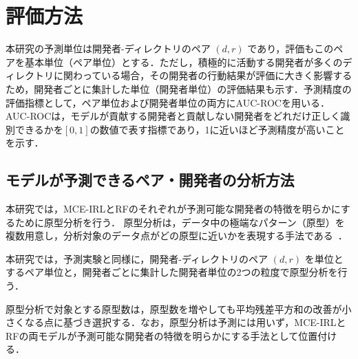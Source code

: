\documentclass[submit,noauthor,ses,dvipdfmx]{ipsj}
\begin{document}
\section{評価方法}\label{sec:evaluation}

本研究の予測単位は開発者-ディレクトリのペア $(d, r)$ であり，評価もこのペアを基本単位（ペア単位）とする．ただし，積極的に活動する開発者が多くのディレクトリに関わっている場合，その開発者の行動結果が評価に大きく影響するため，開発者ごとに集計した単位（開発者単位）の評価結果も示す．予測精度の評価指標として，ペア単位および開発者単位の両方にAUC-ROCを用いる．AUC-ROCは，モデルが貢献する開発者と貢献しない開発者をどれだけ正しく識別できるかを$[0, 1]$の数値で表す指標であり，1に近いほど予測精度が高いことを示す．







\subsection{モデルが予測できるペア・開発者の分析方法}

本研究では，MCE-IRLとRFのそれぞれが予測可能な開発者の特徴を明らかにするために原型分析を行う．
原型分析は，データ中の極端なパターン（原型）を複数用意し，分析対象のデータ点がどの原型に近いかを表現する手法である~\cite{cutler_breiman}．

本研究では，予測実験と同様に，開発者-ディレクトリのペア $(d, r)$ を単位とするペア単位と，開発者ごとに集計した開発者単位の2つの粒度で原型分析を行う．

原型分析で対象とする原型数は，原型数を増やしても平均残差平方和の改善が小さくなる点に基づき選択する．なお，原型分析は予測には用いず，MCE-IRLとRFの両モデルが予測可能な開発者の特徴を明らかにする手法として位置付ける．


\end{document}
